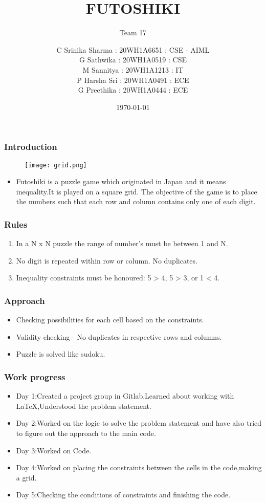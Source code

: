 \documentclass[14pt]{beamer}
\title{FUTOSHIKI}
\subtitle{Team 17}
\date{\today}
\author[Bvrith]{ C Srinika Sharma : 20WH1A6651 : CSE - AIML\\G Sathwika : 20WH1A0519 : CSE\\M Sannitya : 20WH1A1213 : IT \\P Harsha Sri : 20WH1A0491 : ECE\\G Preethika : 20WH1A0444 : ECE}
\begin{document}
   \begin{frame}
        \titlepage
    \end{frame}
   \begin{frame}
	\frametitle{Introduction}
        \begin{figure}
            \texttt{[image: grid.png]}
        \end{figure}
        \begin{itemize}
	    \item Futoshiki is a puzzle game which originated in Japan and it means inequality.It is played on a square grid. The objective of the game is to place the numbers such that each row and column contains only one of each digit.
	\end{itemize}
   \end{frame}
   \begin{frame}
	\frametitle{Rules}
         \begin{enumerate}
	    \item In a N x N puzzle the range of number's must be between 1 and N.  
	    \item No digit is repeated within row or column. No duplicates. 
	    \item Inequality constraints must be honoured: 5 > 4, 5 > 3, or 1 < 4.
	\end{enumerate}
  \end{frame}
\begin{frame}
   \frametitle{Approach}
   \begin{itemize}
       \item Checking possibilities for each cell based on the constraints.
       \item Validity checking - No duplicates in respective rows and columns.
       \item Puzzle is solved like sudoku.
   \end{itemize}
\end{frame}
\begin{frame}
     \frametitle{Work progress}
     \begin{itemize}
         \item Day 1:Created a project group in Gitlab,Learned about working with LaTeX,Understood the problem statement. 
         \item Day 2:Worked on the logic to solve the problem statement and have also tried to figure out the approach to the main code.
         \item Day 3:Worked on Code.
         \item Day 4:Worked on placing the constraints between the cells in the code,making a grid.
         \item Day 5:Checking the conditions of constraints and finishing the code.
     \end{itemize}
\end{frame}
\end{document}
